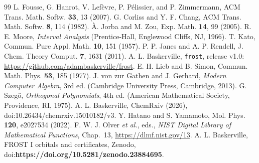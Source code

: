 \documentclass[aps,pra,reprint,superscriptaddress,amsmath,amssymb,longbibliography]{revtex4-2}
\begin{document}
\begin{thebibliography}{99}
 L. Fousse, G. Hanrot, V. Lef\`evre, P. P\'elissier, and P. Zimmermann, ACM Trans. Math. Softw. \textbf{33}, 13 (2007).
 G. Corliss and Y. F. Chang, ACM Trans. Math. Softw. \textbf{8}, 114 (1982).
 \`A. Jorba and M. Zou, Exp. Math. \textbf{14}, 99 (2005).
 R. E. Moore, \textit{Interval Analysis} (Prentice-Hall, Englewood Cliffs, NJ, 1966).
 T. Kato, Commun. Pure Appl. Math. \textbf{10}, 151 (1957).
 P. P. Janes and A. P. Rendell, J. Chem. Theory Comput. \textbf{7}, 1631 (2011).
 A. L. Baskerville, \texttt{frost}, release v1.0: \url{https://github.com/adambaskerville/frost}.
 E. H. Lieb and B. Simon, Commun. Math. Phys. \textbf{53}, 185 (1977).
 J. von zur Gathen and J. Gerhard, \textit{Modern Computer Algebra}, 3rd ed. (Cambridge University Press, Cambridge, 2013).
 G. Szeg\H{o}, \textit{Orthogonal Polynomials}, 4th ed. (American Mathematical Society, Providence, RI, 1975).
 A. L. Baskerville, ChemRxiv (2026), doi:10.26434/chemrxiv.15010182/v3.
 Y. Hatano and S. Yamamoto, Mol. Phys. \textbf{120}, e2027534 (2022).
 F. W. J. Olver \textit{et al.}, eds., \textit{NIST Digital Library of Mathematical Functions}, Chap.~13, \url{https://dlmf.nist.gov/13}.
 A. L. Baskerville, FROST I orbitals and certificates, Zenodo, doi:\textbf{https://doi.org/10.5281/zenodo.23884695}.
\end{thebibliography}
\end{document}
